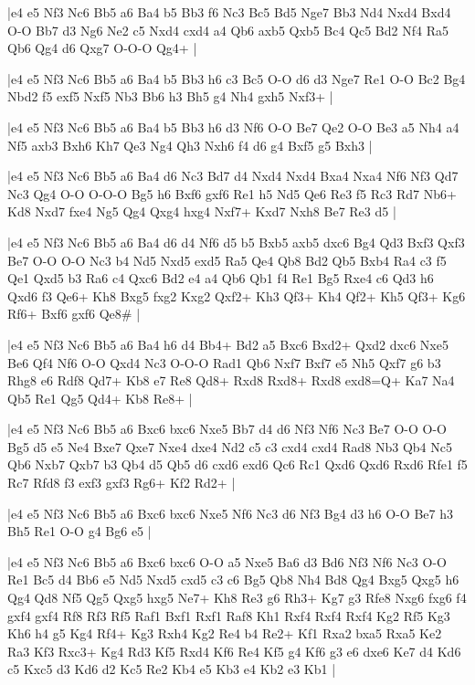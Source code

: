 \whitename{}
\blackname{}
\makegametitle
|e4 e5 Nf3 Nc6 Bb5 a6 Ba4 b5 Bb3 f6 Nc3 Bc5 Bd5 Nge7 Bb3 Nd4 Nxd4 Bxd4 O-O Bb7 d3 Ng6 Ne2 c5 Nxd4 cxd4 a4 Qb6 axb5 Qxb5 Bc4 Qc5 Bd2 Nf4 Ra5 Qb6 Qg4 d6 Qxg7 O-O-O Qg4+  |

\whitename{}
\blackname{}
\makegametitle
|e4 e5 Nf3 Nc6 Bb5 a6 Ba4 b5 Bb3 h6 c3 Bc5 O-O d6 d3 Nge7 Re1 O-O Bc2 Bg4 Nbd2 f5 exf5 Nxf5 Nb3 Bb6 h3 Bh5 g4 Nh4 gxh5 Nxf3+  |

\whitename{}
\blackname{}
\makegametitle
|e4 e5 Nf3 Nc6 Bb5 a6 Ba4 b5 Bb3 h6 d3 Nf6 O-O Be7 Qe2 O-O Be3 a5 Nh4 a4 Nf5 axb3 Bxh6 Kh7 Qe3 Ng4 Qh3 Nxh6 f4 d6 g4 Bxf5 g5 Bxh3  |

\whitename{}
\blackname{}
\makegametitle
|e4 e5 Nf3 Nc6 Bb5 a6 Ba4 d6 Nc3 Bd7 d4 Nxd4 Nxd4 Bxa4 Nxa4 Nf6 Nf3 Qd7 Nc3 Qg4 O-O O-O-O Bg5 h6 Bxf6 gxf6 Re1 h5 Nd5 Qe6 Re3 f5 Rc3 Rd7 Nb6+ Kd8 Nxd7 fxe4 Ng5 Qg4 Qxg4 hxg4 Nxf7+ Kxd7 Nxh8 Be7 Re3 d5  |

\whitename{}
\blackname{}
\makegametitle
|e4 e5 Nf3 Nc6 Bb5 a6 Ba4 d6 d4 Nf6 d5 b5 Bxb5 axb5 dxc6 Bg4 Qd3 Bxf3 Qxf3 Be7 O-O O-O Nc3 b4 Nd5 Nxd5 exd5 Ra5 Qe4 Qb8 Bd2 Qb5 Bxb4 Ra4 c3 f5 Qe1 Qxd5 b3 Ra6 c4 Qxc6 Bd2 e4 a4 Qb6 Qb1 f4 Re1 Bg5 Rxe4 c6 Qd3 h6 Qxd6 f3 Qe6+ Kh8 Bxg5 fxg2 Kxg2 Qxf2+ Kh3 Qf3+ Kh4 Qf2+ Kh5 Qf3+ Kg6 Rf6+ Bxf6 gxf6 Qe8\#  |

\whitename{}
\blackname{}
\makegametitle
|e4 e5 Nf3 Nc6 Bb5 a6 Ba4 h6 d4 Bb4+ Bd2 a5 Bxc6 Bxd2+ Qxd2 dxc6 Nxe5 Be6 Qf4 Nf6 O-O Qxd4 Nc3 O-O-O Rad1 Qb6 Nxf7 Bxf7 e5 Nh5 Qxf7 g6 b3 Rhg8 e6 Rdf8 Qd7+ Kb8 e7 Re8 Qd8+ Rxd8 Rxd8+ Rxd8 exd8=Q+ Ka7 Na4 Qb5 Re1 Qg5 Qd4+ Kb8 Re8+  |

\whitename{}
\blackname{}
\makegametitle
|e4 e5 Nf3 Nc6 Bb5 a6 Bxc6 bxc6 Nxe5 Bb7 d4 d6 Nf3 Nf6 Nc3 Be7 O-O O-O Bg5 d5 e5 Ne4 Bxe7 Qxe7 Nxe4 dxe4 Nd2 c5 c3 cxd4 cxd4 Rad8 Nb3 Qb4 Nc5 Qb6 Nxb7 Qxb7 b3 Qb4 d5 Qb5 d6 cxd6 exd6 Qc6 Rc1 Qxd6 Qxd6 Rxd6 Rfe1 f5 Rc7 Rfd8 f3 exf3 gxf3 Rg6+ Kf2 Rd2+  |

\whitename{}
\blackname{}
\makegametitle
|e4 e5 Nf3 Nc6 Bb5 a6 Bxc6 bxc6 Nxe5 Nf6 Nc3 d6 Nf3 Bg4 d3 h6 O-O Be7 h3 Bh5 Re1 O-O g4 Bg6 e5  |

\whitename{}
\blackname{}
\makegametitle
|e4 e5 Nf3 Nc6 Bb5 a6 Bxc6 bxc6 O-O a5 Nxe5 Ba6 d3 Bd6 Nf3 Nf6 Nc3 O-O Re1 Bc5 d4 Bb6 e5 Nd5 Nxd5 cxd5 c3 c6 Bg5 Qb8 Nh4 Bd8 Qg4 Bxg5 Qxg5 h6 Qg4 Qd8 Nf5 Qg5 Qxg5 hxg5 Ne7+ Kh8 Re3 g6 Rh3+ Kg7 g3 Rfe8 Nxg6 fxg6 f4 gxf4 gxf4 Rf8 Rf3 Rf5 Raf1 Bxf1 Rxf1 Raf8 Kh1 Rxf4 Rxf4 Rxf4 Kg2 Rf5 Kg3 Kh6 h4 g5 Kg4 Rf4+ Kg3 Rxh4 Kg2 Re4 b4 Re2+ Kf1 Rxa2 bxa5 Rxa5 Ke2 Ra3 Kf3 Rxc3+ Kg4 Rd3 Kf5 Rxd4 Kf6 Re4 Kf5 g4 Kf6 g3 e6 dxe6 Ke7 d4 Kd6 c5 Kxc5 d3 Kd6 d2 Kc5 Re2 Kb4 e5 Kb3 e4 Kb2 e3 Kb1  |


